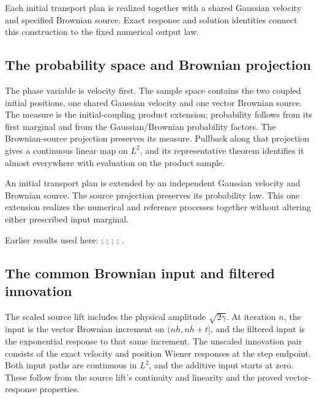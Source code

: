 \documentclass[11pt,a4paper]{report}
\begin{document}
Each initial transport plan is realized together with a shared Gaussian velocity and specified Brownian source. Exact response and solution identities connect this construction to the fixed numerical output law.

\subsection{\texorpdfstring{The probability space and Brownian projection}{The probability space and Brownian projection}}
\label{report-step-KineticLangevin-CanonicalCoupledSegments-lean-1}


The phase variable is velocity first. The sample space contains the two coupled initial positions, one shared Gaussian velocity and one vector Brownian source. The measure is the initial-coupling product extension; probability follows from its first marginal and from the Gaussian/\allowbreak{}Brownian probability factors. The Brownian-source projection preserves its measure. Pullback along that projection gives a continuous linear map on \(L^{2}\), and its representative theorem identifies it almost everywhere with evaluation on the product sample.



An initial transport plan is extended by an independent Gaussian velocity and Brownian source. The source projection preserves its probability law. This one extension realizes the numerical and reference processes together without altering either prescribed input marginal.



Earlier results used here: \cite[Section~3.17.1]{LangevinLean2026ULASC}; \cite[Section~3.22.2]{LangevinLean2026ULASC}; \cite[Section~3.22.3]{LangevinLean2026ULASC}; \cite[Section~3.8.16]{LangevinLean2026ULASC}; \cite[Section~3.8.17]{LangevinLean2026ULASC}.
\subsection{\texorpdfstring{The common Brownian input and filtered innovation}{The common Brownian input and filtered innovation}}
\label{report-step-KineticLangevin-CanonicalCoupledSegments-lean-2}


The scaled source lift includes the physical amplitude \(\sqrt{2\gamma}\). At iteration \(n\), the input is the vector Brownian increment on \((nh,nh+t]\), and the filtered input is the exponential response to that same increment. The unscaled innovation pair consists of the exact velocity and position Wiener responses at the step endpoint. Both input paths are continuous in \(L^{2}\), and the additive input starts at zero. These follow from the source lift's continuity and linearity and the proved vector-response properties.
\end{document}
